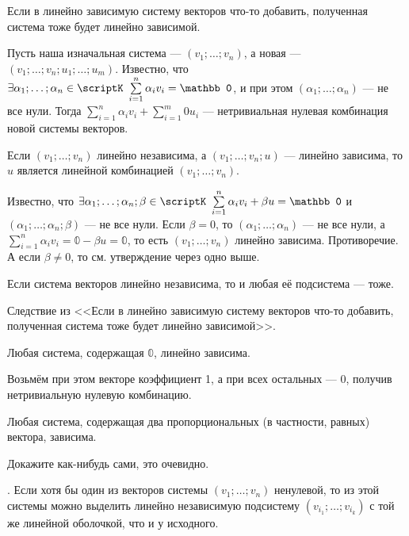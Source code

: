 \documentclass{article}
\begin{document}
\begin{itemize}
\begin{Proof}
        \end{Proof}
        \thm Если в линейно зависимую систему векторов что-то добавить, полученная система тоже будет линейно зависимой.
        \begin{Proof}
            Пусть наша изначальная система --- $(v_1;\ldots;v_n)$, а новая --- $(v_1;\ldots;v_n;u_1;\ldots;u_m)$. Известно, что $\exists\alpha_1;\ldots;\alpha_n\in\scriptK~\sum\limits_{i=1}^n\alpha_iv_i=\mathbb0$, и при этом $(\alpha_1;\ldots;\alpha_n)$ --- не все нули. Тогда $\sum\limits_{i=1}^n\alpha_iv_i+\sum\limits_{i=1}^m0u_i$ --- нетривиальная нулевая комбинация новой системы векторов.
        \end{Proof}
        \thm Если $(v_1;\ldots;v_n)$ линейно независима, а $(v_1;\ldots;v_n;u)$ --- линейно зависима, то $u$ является линейной комбинацией $(v_1;\ldots;v_n)$.
        \begin{Proof}
            Известно, что $\exists\alpha_1;\ldots;\alpha_n;\beta\in\scriptK~\sum\limits_{i=1}^n\alpha_iv_i+\beta u=\mathbb0$ и $(\alpha_1;\ldots;\alpha_n;\beta)$ --- не все нули. Если $\beta=0$, то $(\alpha_1;\ldots;\alpha_n)$ --- не все нули, а $\sum\limits_{i=1}^n\alpha_iv_i=\mathbb0-\beta u=\mathbb 0$, то есть $(v_1;\ldots;v_n)$ линейно зависима. Противоречие. А если $\beta\neq0$, то см. утверждение через одно выше.
        \end{Proof}
        \thm Если система векторов линейно независима, то и любая её подсистема --- тоже.
        \begin{Proof}
            Следствие из <<Если в линейно зависимую систему векторов что-то добавить, полученная система тоже будет линейно зависимой>>.
        \end{Proof}
        \thm Любая система, содержащая $\mathbb0$, линейно зависима.
        \begin{Proof}
            Возьмём при этом векторе коэффициент 1, а при всех остальных --- 0, получив нетривиальную нулевую комбинацию.
        \end{Proof}
        \thm Любая система, содержащая два пропорциональных (в частности, равных) вектора, зависима.
        \begin{Proof}
            Докажите как-нибудь сами, это очевидно.
        \end{Proof}
        \thm {}. Если хотя бы один из векторов системы $(v_1;\ldots;v_n)$ ненулевой, то из этой системы можно выделить линейно независимую подсистему $(v_{i_1};\ldots;v_{i_k})$ с той же линейной оболочкой, что и у исходного.

\end{itemize}
\end{document}
